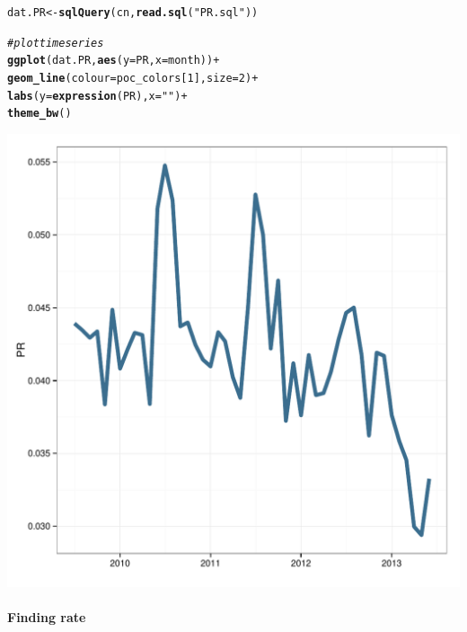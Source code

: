 \documentclass[12pt]{article}\usepackage[]{graphicx}\usepackage[]{color}
\makeatletter
\def\maxwidth{ %
  \ifdim\Gin@nat@width>\linewidth
    \linewidth
  \else
    \Gin@nat@width
  \fi
}
\newcommand{\hlnum}[1]{\textcolor[rgb]{0.686,0.059,0.569}{#1}}%
\newcommand{\hlstr}[1]{\textcolor[rgb]{0.192,0.494,0.8}{#1}}%
\newcommand{\hlcom}[1]{\textcolor[rgb]{0.678,0.584,0.686}{\textit{#1}}}%
\newcommand{\hlopt}[1]{\textcolor[rgb]{0,0,0}{#1}}%
\newcommand{\hlstd}[1]{\textcolor[rgb]{0.345,0.345,0.345}{#1}}%
\newcommand{\hlkwb}[1]{\textcolor[rgb]{0.69,0.353,0.396}{#1}}%
\newcommand{\hlkwc}[1]{\textcolor[rgb]{0.333,0.667,0.333}{#1}}%
\newcommand{\hlkwd}[1]{\textcolor[rgb]{0.737,0.353,0.396}{\textbf{#1}}}%
\newenvironment{kframe}{%
 \def\at@end@of@kframe{}%
 \ifinner\ifhmode%
  \def\at@end@of@kframe{\end{minipage}}%
  \begin{minipage}{\columnwidth}%
 \fi\fi%
 \def\FrameCommand##1{\hskip\@totalleftmargin \hskip-\fboxsep
 \colorbox{shadecolor}{##1}\hskip-\fboxsep
     \hskip-\linewidth \hskip-\@totalleftmargin \hskip\columnwidth}%
 \MakeFramed {\advance\hsize-\width
   \@totalleftmargin\z@ \linewidth\hsize
   \@setminipage}}%
 {\par\unskip\endMakeFramed%
 \at@end@of@kframe}
\newenvironment{knitrout}{}{} %
\makeatother
\begin{document}
\begin{knitrout}
\color{fgcolor}\begin{kframe}
\begin{alltt}
\hlstd{dat.PR} \hlkwb{<-} \hlkwd{sqlQuery}\hlstd{(cn,} \hlkwd{read.sql}\hlstd{(}\hlstr{"PR.sql"}\hlstd{))}

\hlcom{#plot time series}
\hlkwd{ggplot}\hlstd{(dat.PR,} \hlkwd{aes}\hlstd{(}\hlkwc{y}\hlstd{=PR,} \hlkwc{x}\hlstd{=month))} \hlopt{+}
  \hlkwd{geom_line}\hlstd{(}\hlkwc{colour}\hlstd{=poc_colors[}\hlnum{1}\hlstd{],} \hlkwc{size}\hlstd{=}\hlnum{2}\hlstd{)} \hlopt{+}
  \hlkwd{labs}\hlstd{(}\hlkwc{y} \hlstd{=} \hlkwd{expression}\hlstd{(PR),} \hlkwc{x} \hlstd{=} \hlstr{""}\hlstd{)} \hlopt{+}
  \hlkwd{theme_bw}\hlstd{()}
\end{alltt}
\end{kframe}

{\centering \includegraphics[width=\maxwidth]{figure/PR} 

}



\end{knitrout}



\paragraph{Finding rate}
\end{document}
